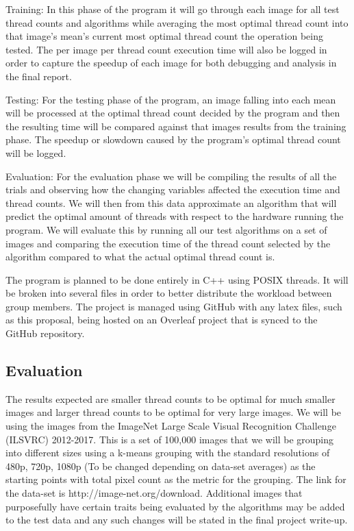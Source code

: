 \documentclass{article}
\begin{document}
\begin{multicols}{2}
                Training: In this phase of the program it will go through each image for all test thread counts and algorithms while averaging the most optimal thread count into that image's mean's current most optimal thread count the operation being tested.  The per image per thread count execution time will also be logged in order to capture the speedup of each image for both debugging and analysis in the final report.
                
                Testing: For the testing phase of the program, an image falling into each mean will be processed at the optimal thread count decided by the program and then the resulting time will be compared against that images results from the training phase.  The speedup or slowdown caused by the program's optimal thread count will be logged.  
                
                Evaluation: For the evaluation phase we will be compiling the results of all the trials and observing how the changing variables affected the execution time and thread counts.  We will then from this data approximate an algorithm that will predict the optimal amount of threads with respect to the hardware running the program.  We will evaluate this by running all our test algorithms on a set of images and comparing the execution time of the thread count selected by the algorithm compared to what the actual optimal thread count is.
                
                The program is planned to be done entirely in C++ using POSIX threads.  It will be broken into several files in order to better distribute the workload between group members.  The project is managed using GitHub with any latex files, such as this proposal, being hosted on an Overleaf project that is synced to the GitHub repository.
            
            \subsection{Evaluation}
                The results expected are smaller thread counts to be optimal for much smaller images and larger thread counts to be optimal for very large images.  We will be using the images from the  ImageNet Large Scale Visual Recognition Challenge (ILSVRC) 2012-2017.  This is a set of 100,000 images that we will be grouping into different sizes using a k-means grouping with the standard resolutions of 480p, 720p, 1080p (To be changed depending on data-set averages) as the starting points with total pixel count as the metric for the grouping.  The link for the data-set is http://image-net.org/download.  Additional images that purposefully have certain traits being evaluated by the algorithms may be added to the test data and any such changes will be stated in the final project write-up.
                

\end{multicols}
\end{document}

